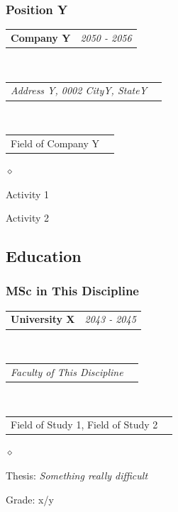 \documentclass[a4paper]{article}
\makeatletter
\newlength{\sectsep}
\newcommand{\headerrow}[2]
{\begin{tabular*}{\textwidth}{l@{\extracolsep{\fill}}r}
    #1 &
    #2 \\
\end{tabular*}}
\renewenvironment{itemize}{
  \begin{list}{$\diamond$}{
    \setlength{\topsep}{0.25em}
    \setlength{\itemsep}{0em}
    \setlength{\parskip}{0pt}
    \setlength{\parsep}{0em}
  }
}{
  \end{list}
}
\makeatother
\begin{document}
      \subsubsection*{Position Y}
      \headerrow
        {\textbf{Company Y}}{\emph{2050 - 2056}}
      \\
      \headerrow
        {\emph{Address Y, 0002 CityY, StateY}}{}
      \\
      \headerrow
          {Field of Company Y}{}

      \begin{itemize}
          \item Activity 1
          \item Activity 2
      \end{itemize}


      \subsection*{Education}
      \subsubsection*{MSc in This Discipline}
      \headerrow
        {\textbf{University X}}{\emph{2043 - 2045}}
      \\
      \headerrow
        {\emph{Faculty of This Discipline}}{}
      \\
      \headerrow
        {Field of Study 1, Field of Study 2}{}

      \begin{itemize}
          \item Thesis: \emph{Something really difficult}
          \item Grade: x/y
      \end{itemize}
\end{document}
